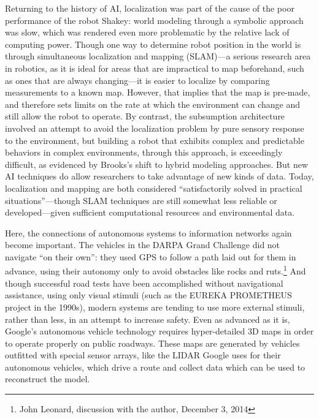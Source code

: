 Returning to the history of AI,
localization was part of the cause of the poor performance of the
robot Shakey: world modeling through a symbolic approach was slow,
which was rendered even more problematic by the relative lack of
computing power.\cite{???-mccorduck?}
Though one way to determine robot position in the world is through
simultaneous localization and mapping (SLAM)---a serious research area in
robotics, as it is ideal for areas that are impractical to map
beforehand, such as ones that are always changing---it is easier to localize by comparing
measurements to a known map. However, that implies that the map is
pre-made, and therefore sets limits on the rate at which the
environment can change and still allow the robot to operate. By
contrast, the subsumption architecture involved an
attempt to avoid the localization problem by pure sensory response to
the environment, but building a robot that exhibits complex and
predictable behaviors in complex environments, through this approach,
is exceedingly difficult, as evidenced by Brooks's shift to hybrid
modeling approaches. But new AI techniques do allow researchers to
take advantage of new kinds of data.\cite{???} Today, localization and
mapping are both considered ``satisfactorily solved in practical
situations''---though SLAM techniques
are still somewhat less reliable or developed---given sufficient
computational resources and environmental data.\cite[p.
  5-6]{???-SLAMbook}


Here, the connections of autonomous systems to information networks
again become important. The vehicles in the
DARPA Grand Challenge did not navigate ``on their own'': they used GPS
to follow a path laid out for them in advance, using their autonomy
only to avoid obstacles like rocks and ruts.\footnote{John Leonard,
  discussion with the author, December 3, 2014} And though successful
road tests have been accomplished without navigational assistance,
using only visual stimuli (such as the EUREKA PROMETHEUS project
in the 1990s)\cite{???}, modern systems are tending to use more external
stimuli, rather than less, in an attempt to increase safety. Even as
advanced as it is, Google's autonomous vehicle technology requires
hyper-detailed 3D maps in order to operate properly on public
roadways.\cite{???} These maps are generated by vehicles outfitted with
special sensor arrays, like the LIDAR Google uses for their autonomous
vehicles, which drive a route and collect data which can be used to
reconstruct the model.\cite{???}

